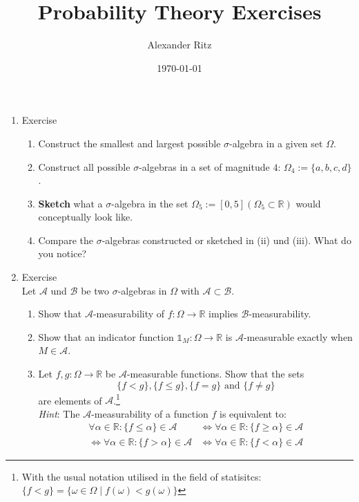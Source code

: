 \documentclass[12pt,a4paper]{article}
\title{Probability Theory Exercises}
\author{Alexander Ritz}
\date{\today}
\begin{document}
\maketitle

\begin{enumerate}

\item Exercise 
\begin{enumerate}[label=(\roman*)]

\item Construct the smallest and largest possible $\sigma$-algebra in a given set $\Omega$.

\item Construct all possible $\sigma$-algebras in a set of magnitude $4$: $\Omega_4:=\{a, b, c, d\}$.

\item\textbf{Sketch} what a $\sigma$-algebra in the set $\Omega_5:= \left[0, 5 \right] (\Omega_5 \subset \mathbb{R})$ would conceptually look like.

\item Compare the $\sigma$-algebras constructed or sketched in (ii) und (iii). What do you notice?

\end{enumerate}


\item Exercise \\
Let $\mathscr{A}$ und $\mathscr{B}$ be two $\sigma$-algebras in $\Omega$ with $\mathscr{A} \subset \mathscr{B}$.
\begin{enumerate}[label=(\roman*)]

\item Show that $\mathscr{A}$-measurability of $f:\Omega \to \mathbb{R}$ implies $\mathscr{B}$-measurability.

\item Show that an indicator function $\mathds{1}_M:\Omega \to \mathbb{R}$ is $\mathscr{A}$-measurable exactly when $M \in \mathscr{A}$.

\item Let $f, g: \Omega\to \mathbb{R}$ be $\mathscr{A}$-measurable functions. Show that the sets \[\{f < g\}, \{f \leq g\}, \{f = g\}\text{ and }\{ f \neq g\}\] are elements of $\mathscr{A}$.\footnote{With the usual notation utilised in the field of statisitcs: $\{f < g\} = \{\omega \in \Omega \mid f(\omega) < g(\omega)\}$} \\ \textit{Hint}: The $\mathscr{A}$-measurability of a function $f$ is equivalent to:\begin{align*}
\forall \alpha \in \mathbb{R} : \{ f \leq \alpha\} \in \mathscr{A} &\iff \forall \alpha \in \mathbb{R} : \{ f \geq \alpha\} \in \mathscr{A}\\ \iff \forall \alpha \in \mathbb{R} : \{ f > \alpha\} \in \mathscr{A} &\iff \forall \alpha \in \mathbb{R} : \{ f < \alpha\} \in \mathscr{A}
\end{align*}



\end{enumerate}
\end{enumerate}
\end{document}
